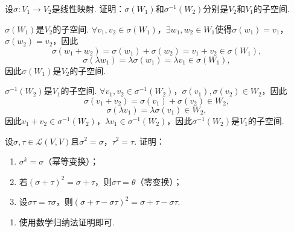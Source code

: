 \begin{exercise}

    \begin{exgroup}
        \item 设$\sigma: V_1\to V_2$是线性映射. 证明：$\sigma(W_1)$和$\sigma^{-1}(W_2)$分别是$V_2$和$V_1$的子空间.

        \begin{answer}
            $\sigma(W_1)$是$V_2$的子空间. $\forall v_1,v_2\in\sigma(W_1)$，$\exists w_1,w_2\in W_1$使得$\sigma(w_1)=v_1$，$\sigma(w_2)=v_2$，因此
            \[\sigma(w_1+w_2)=\sigma(w_1)+\sigma(w_2)=v_1+v_2\in\sigma(W_1),\]
            \[\sigma(\lambda w_1)=\lambda\sigma(w_1)=\lambda v_1\in\sigma(W_1),\]
            因此$\sigma(W_1)$是$V_2$的子空间.

            $\sigma^{-1}(W_2)$是$V_1$的子空间. $\forall v_1,v_2\in\sigma^{-1}(W_2)$，$\sigma(v_1),\sigma(v_2)\in W_2$，因此
            \[\sigma(v_1+v_2)=\sigma(v_1)+\sigma(v_2)\in W_2,\]
            \[\sigma(\lambda v_1)=\lambda\sigma(v_1)\in W_2,\]
            因此$v_1+v_2\in\sigma^{-1}(W_2)$，$\lambda v_1\in\sigma^{-1}(W_2)$，因此$\sigma^{-1}(W_2)$是$V_1$的子空间.
        \end{answer}

        \item 设$\sigma,\tau \in \mathcal{L}(V,V)$且$\sigma^2=\sigma$，$\tau^2=\tau$. 证明：
        \begin{enumerate}
            \item $\sigma^k=\sigma$（幂等变换）；

            \item 若$(\sigma+\tau)^2=\sigma+\tau$，则$\sigma\tau=\theta$（零变换）；

            \item 设$\sigma\tau=\tau\sigma$，则$(\sigma+\tau-\sigma\tau)^2=\sigma+\tau-\sigma\tau$.
        \end{enumerate}
        \begin{answer}
            \begin{enumerate}
                \item 使用数学归纳法证明即可.


\end{enumerate}
\end{answer}
\end{exgroup}
\end{exercise}
